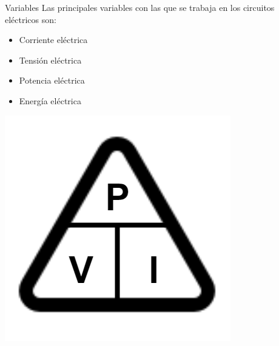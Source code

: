 \documentclass[aspectratio=169, xcolor={usenames,svgnames,dvipsnames}]{beamer}
\begin{document}
\begin{frame}{Variables}
    Las principales \alert{variables} con las que se trabaja en los circuitos eléctricos son:
    \begin{minipage}[c]{0.55\linewidth}
        \begin{itemize}
        \item Corriente eléctrica
        \item Tensión eléctrica
        \item Potencia eléctrica
        \item Energía eléctrica
    \end{itemize}
    \end{minipage}
    \hfill
    \begin{minipage}[c]{0.4\linewidth}
        \includegraphics[width=0.6\linewidth]{../figs/piv.jpg}
    \end{minipage}
\end{frame}
\end{document}
